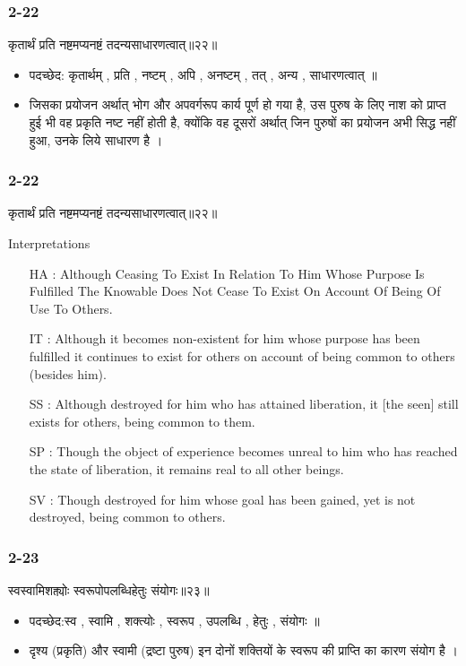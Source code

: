 \begin{frame}[fragile]\frametitle{2-22}
\begin{sanskrit}
कृतार्थं प्रति नष्टमप्यनष्टं तदन्यसाधारणत्वात्॥२२॥
\end{sanskrit}

\begin{itemize}
\item पदच्छेद: कृतार्थम् , प्रति , नष्टम् , अपि , अनष्टम् , तत् , अन्य , साधारणत्वात् ॥
\item जिसका प्रयोजन अर्थात् भोग और अपवर्गरूप कार्य पूर्ण हो गया है, उस पुरुष के लिए नाश को प्राप्त हुई भी वह प्रकृति नष्ट नहीं होती है, क्योंकि वह दूसरों अर्थात् जिन पुरुषों का प्रयोजन अभी सिद्ध नहीं हुआ, उनके लिये साधारण है ।
\end{itemize}

\end{frame}


\begin{frame}[fragile]\frametitle{2-22}
\begin{sanskrit}
कृतार्थं प्रति नष्टमप्यनष्टं तदन्यसाधारणत्वात्॥२२॥
\end{sanskrit}

Interpretations
\begin{itemize}
\item [HA]: Although Ceasing To Exist In Relation To Him Whose Purpose Is Fulfilled The Knowable Does Not Cease To Exist On Account Of Being Of Use To Others.
\item [IT]: Although it becomes non-existent for him whose purpose has been fulfilled it continues to exist for others on account of being common to others (besides him).
\item [SS]: Although destroyed for him who has attained liberation, it [the seen] still exists for others, being common to them.
\item [SP]: Though the object of experience becomes unreal to him who has reached the state of liberation, it remains real to all other beings.
\item [SV]: Though destroyed for him whose goal has been gained, yet is not destroyed, being common to others. 
\end{itemize}

\end{frame}


\begin{frame}[fragile]\frametitle{2-23}
\begin{sanskrit}
स्वस्वामिशक्त्योः स्वरूपोपलब्धिहेतुः संयोगः॥२३॥
\end{sanskrit}

\begin{itemize}
\item पदच्छेद:स्व , स्वामि , शक्त्योः , स्वरूप , उपलब्धि , हेतुः , संयोगः ॥
\item दृश्य (प्रकृति) और स्वामी (द्रष्टा पुरुष) इन दोनों शक्तियों के स्वरूप की प्राप्ति का कारण संयोग है ।
\end{itemize}
	
\end{frame}


